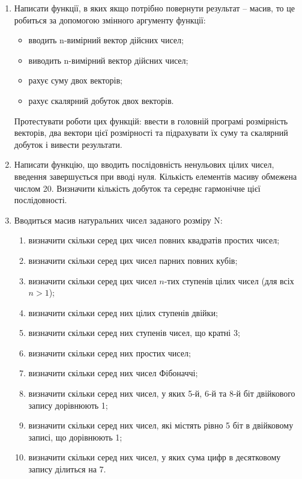 \documentclass[]{article}
\makeatletter
\newcommand{\xslalph}[1]{\expandafter\@xslalph\csname c@#1\endcsname}
\newcommand{\@xslalph}[1]{%
    \ifcase#1\or а\or б\or в\or г\or д\or e\or є\or ж\or з\or i%
    \or й\or к\or л\or м\or н\or о\or п\or р\or с\or т%
    \or у\or ф\or х\or ц\or ч\or ш\or ю\or я\or аа\or бб\or вв %
    \else\@ctrerr\fi%
}
\makeatother
\begin{document}
\begin{enumerate}
\item
Написати функції, в яких якщо потрібно повернути результат -- масив,
то це робиться за допомогою змінного аргументу функції:
\begin{itemize}
\item вводить n-вимірний вектор дійсних чисел;
\item виводить n-вимірний вектор дійсних чисел;
\item рахує суму двох векторів;
\item рахує скалярний добуток двох векторів.
 \end{itemize}
Протестувати роботи цих функцій: ввести в головній програмі розмірність
векторів, два вектори цієї розмірності та підрахувати їх суму та скалярний
добуток і вивести результати.
\item
  Написати функцію, що вводить послідовність ненульових цілих чисел,
  введення завершується при вводі нуля. Кількість елементів масиву
  обмежена числом 20. Визначити кількість добуток та середнє гармонічне
  цієї послідовності.
\item
  Вводиться масив натуральних чисел заданого розміру N:
\begin{enumerate}[label=\xslalph*)]
\item визначити скільки серед цих чисел повних квадратів простих чисел;
\item визначити скільки серед цих чисел парних повних кубів;
\item визначити скільки серед цих чисел $n$-тих ступенів цілих чисел (для
всіх $n>1$);
\item визначити скільки серед них цілих ступенів двійки;
\item визначити скільки серед них ступенів чисел, що кратні 3;
\item визначити скільки серед них простих чисел;
\item визначити скільки серед них чисел Фібоначчі;
\item визначити скільки серед них чисел, у яких 5-й, 6-й та 8-й біт
двійкового запису дорівнюють 1;
\item визначити скільки серед них чисел, які містять рівно 5 біт в
двійковому записі, що дорівнюють 1;
\item визначити скільки серед них чисел, у яких сума цифр в десятковому
запису ділиться на 7.
 \end{enumerate}


\end{enumerate}
\end{document}
